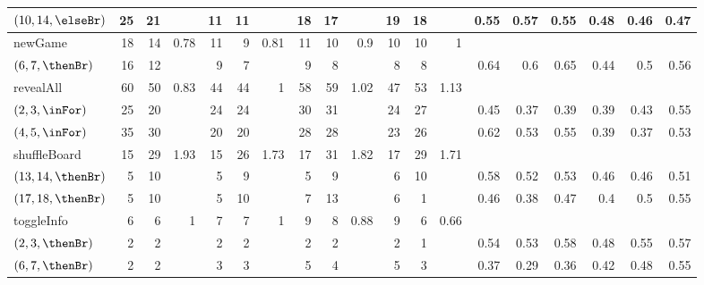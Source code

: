 \begin{table}
\begin{tabular}{l|rrr|rrr|rrr|rrr|rrrrrr}
    $(10,14,\elseBr)$  & 25   & 21  &                    & 11 & 11 &                        & 18 & 17    &                     & 19 & 18    & & 0.55 & 0.57 & 0.55 & 0.48 & 0.46 & 0.47 \\
    \midrule
    newGame            & 18   & 14  & 0.78               & 11 & 9  & 0.81                   & 11 & 10    & 0.9                 & 10 & 10    & 1 &      &      &      &      &     & \\
    $(6,7,\thenBr)$    & 16   & 12  &                    & 9  & 7  &                        & 9  & 8     &                     & 8  & 8     & & 0.64 & 0.6  & 0.65 & 0.44 & 0.5 & 0.56 \\
    \midrule
    revealAll          & 60   & 50  & 0.83               & 44 & 44 & 1                      & 58 & 59    & 1.02                & 47 & 53    & 1.13 &      &      &      &      &      & \\
    $(2,3,\inFor)$     & 25   & 20  &                    & 24 & 24 &                        & 30 & 31    &                     & 24 & 27    & & 0.45 & 0.37 & 0.39 & 0.39 & 0.43 & 0.55 \\
    $(4,5,\inFor)$     & 35   & 30  &                    & 20 & 20 &                        & 28 & 28    &                     & 23 & 26    & & 0.62 & 0.53 & 0.55 & 0.39 & 0.37 & 0.53 \\
    \midrule
    shuffleBoard       & 15   & 29  & 1.93               & 15 & 26 & 1.73                   & 17 & 31    &  1.82               & 17 & 29    & 1.71 &      &      &      &      &      & \\
    $(13,14,\thenBr)$  & 5    & 10  &                    & 5  & 9  &                        & 5  & 9     &                     & 6  & 10    & & 0.58 & 0.52 & 0.53 & 0.46 & 0.46 & 0.51 \\
    $(17,18,\thenBr)$  & 5    & 10  &                    & 5  & 10 &                        & 7  & 13    &                     & 6  & 1     & & 0.46 & 0.38 & 0.47 & 0.4  & 0.5  & 0.55 \\
    \midrule
    \midrule
    toggleInfo         & 6    & 6  & 1                   & 7  & 7 & 1                       & 9  & 8     & 0.88                & 9 & 6      & 0.66 &      &      &      &      &      & \\
    $(2,3,\thenBr)$    & 2    & 2  &                     & 2  & 2 &                         & 2  & 2     &                     & 2 & 1      & & 0.54 & 0.53 & 0.58 & 0.48 & 0.55 & 0.57 \\
    $(6,7,\thenBr)$    & 2    & 2  &                     & 3  & 3 &                         & 5  & 4     &                     & 5 & 3      & & 0.37 & 0.29 & 0.36 & 0.42 & 0.48 & 0.55 \\

\end{tabular}
\end{table}

